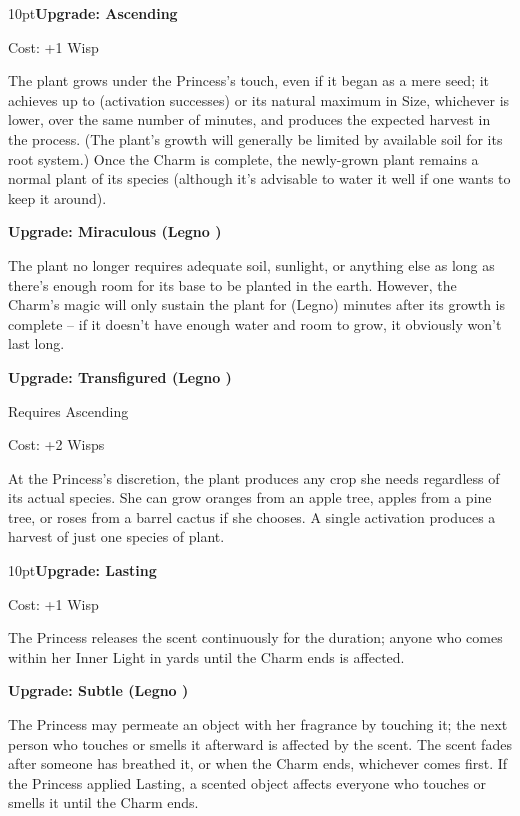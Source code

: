 \begin{myindentpar}{10pt}\textbf{Upgrade: Ascending}

\noindent Cost: +1 Wisp

The plant grows under the Princess's touch, even if it began as a mere seed; it achieves up to (activation successes) or its natural maximum in Size, whichever is lower, over the same number of minutes, and produces the expected harvest in the process. (The plant's growth will generally be limited by available soil for its root system.) Once the Charm is complete, the newly-grown plant remains a normal plant of its species (although it's advisable to water it well if one wants to keep it around).

\textbf{Upgrade: Miraculous (Legno \textbullet\textbullet)}

The plant no longer requires adequate soil, sunlight, or anything else as long as there's enough room for its base to be planted in the earth. However, the Charm's magic will only sustain the plant for (Legno) minutes after its growth is complete -- if it doesn't have enough water and room to grow, it obviously won't last long.

\textbf{Upgrade: Transfigured (Legno \textbullet\textbullet\textbullet)}

\noindent Requires Ascending

\noindent Cost: +2 Wisps

At the Princess's discretion, the plant produces any crop she needs regardless of its actual species. She can grow oranges from an apple tree, apples from a pine tree, or roses from a barrel cactus if she chooses. A single activation produces a harvest of just one species of plant. 
\end{myindentpar}

\begin{myindentpar}{10pt}\textbf{Upgrade: Lasting}

\noindent Cost: +1 Wisp

The Princess releases the scent continuously for the duration; anyone who comes within her Inner Light in yards until the Charm ends is affected.

\textbf{Upgrade: Subtle (Legno \textbullet\textbullet)}

The Princess may permeate an object with her fragrance by touching it; the next person who touches or smells it afterward is affected by the scent. The scent fades after someone has breathed it, or when the Charm ends, whichever comes first. If the Princess applied Lasting, a scented object affects everyone who touches or smells it until the Charm ends.\end{myindentpar}


